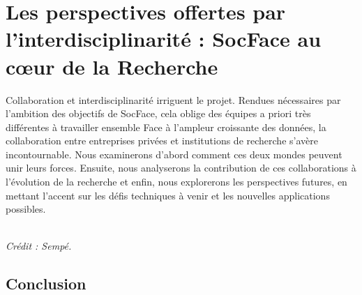 \documentclass[a4paper,12pt,twoside]{book}
\begin{document}
 
 
 
	
    \part{Les perspectives offertes par l’interdisciplinarité : SocFace au cœur de la Recherche}

Collaboration et interdisciplinarité irriguent le projet. Rendues nécessaires par l’ambition des objectifs de SocFace, cela oblige des équipes a priori très différentes à travailler ensemble Face à l’ampleur croissante des données, la collaboration entre entreprises privées et institutions de recherche s'avère incontournable. Nous examinerons d'abord comment ces deux mondes peuvent unir leurs forces. Ensuite, nous analyserons la contribution de ces collaborations à l’évolution de la recherche et enfin, nous explorerons les perspectives futures, en mettant l’accent sur les défis techniques à venir et les nouvelles applications possibles.
\vspace*{\fill}
\begin{center}
  \setlength{\fboxsep}{5pt}  %
  \setlength{\fboxrule}{1pt} %
  \\
    \vspace{0.5em} %
    {\scriptsize \textit{Crédit : Sempé.}}
\end{center}




 
	\chapter*{Conclusion}
\end{document}
